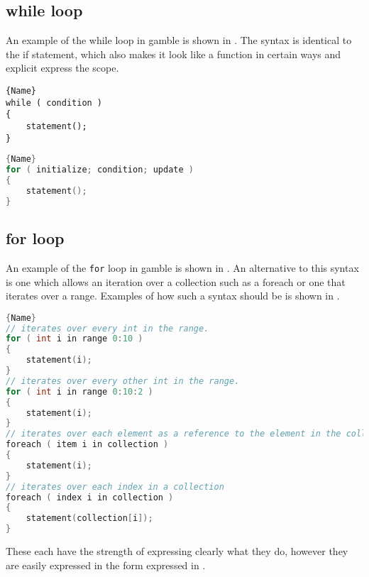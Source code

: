 \subsection{while loop}
An example of the while loop in \gls{gamble} is shown in . 
The syntax is identical to the if statement, which also makes it look like a function in certain ways and explicit express the scope.

\vspace{10pt}
\noindent\begin{minipage}{.40\textwidth}
\begin{lstlisting}[caption=A while loop in \gls{gamble}.,frame=tlrb, label=whilelst, numbers=none]{Name}
while ( condition )
{
    statement();
}
\end{lstlisting}
\end{minipage}\hfill
\begin{minipage}{.50\textwidth}
\begin{lstlisting}[caption=A for loop in \gls{gamble}.,frame=tlrb, label=forlst, numbers=none, language=C]{Name}
for ( initialize; condition; update )
{
    statement();
}
\end{lstlisting}
\end{minipage}

\subsection{for loop}
An example of the \texttt{for} loop in \gls{gamble} is shown in .
An alternative to this syntax is one which allows an iteration over a collection such as a foreach or one that iterates over a range.
Examples of how such a syntax should be is shown in .

\begin{lstlisting}[caption=Alternative syntaxes for the for loop.,frame=tlrb, label=forextlst, numbers=none, language=C]{Name}
// iterates over every int in the range.
for ( int i in range 0:10 )
{
    statement(i);
}
// iterates over every other int in the range.
for ( int i in range 0:10:2 )
{
    statement(i);
}
// iterates over each element as a reference to the element in the collection
foreach ( item i in collection )
{
    statement(i);
}
// iterates over each index in a collection
foreach ( index i in collection )
{
    statement(collection[i]);
}
\end{lstlisting}

These each have the strength of expressing clearly what they do, however they are easily expressed in the form expressed in .

